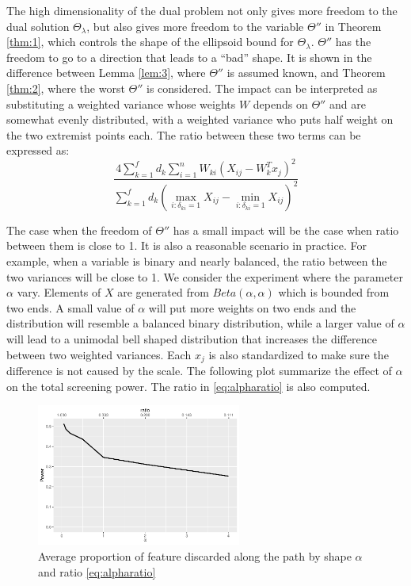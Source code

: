 The high dimensionality of the dual problem not only gives more freedom to the dual solution $\Theta_\lambda$, but also gives more freedom to the variable $\Theta''$ in Theorem \ref{thm:1}, which controls the shape of the ellipsoid bound for $\Theta_\lambda$. $\Theta''$ has the freedom to go to a direction that leads to a ``bad'' shape. It is shown in the difference between Lemma \ref{lem:3}, where $\Theta''$ is assumed known, and Theorem \ref{thm:2}, where the worst $\Theta''$ is considered. The impact can be interpreted as substituting a weighted variance whose weights $W$ depends on $\Theta''$ and are somewhat evenly distributed, with a weighted variance who puts half weight on the two extremist points each. The ratio between these two terms can be expressed as:
\begin{equation}
    \label{eq:alpharatio}
    \frac{4\sum_{k=1}^fd_k\sum_{i=1}^nW_{ki}\left(X_{ij}-W_k^Tx_j\right)^2}{\sum_{k=1}^fd_k\left(\max_{i:\delta_{ki}=1}X_{ij}-\min_{i:\delta_{ki}=1}X_{ij}\right)^2}
\end{equation}

The case when the freedom of $\Theta''$ has a small impact will be the case when ratio between them is close to 1. It is also a reasonable scenario in practice. For example, when a variable is binary and nearly balanced, the ratio between the two variances will be close to 1. We consider the experiment where the parameter $\alpha$ vary. Elements of $X$ are generated from $Beta(\alpha,\alpha)$ which is bounded from two ends. A small value of $\alpha$ will put more weights on two ends and the distribution will resemble a balanced binary distribution, while a larger value of $\alpha$ will lead to a unimodal bell shaped distribution that increases the difference between two weighted variances. Each $x_j$ is also standardized to make sure the difference is not caused by the scale. The following plot summarize the effect of $\alpha$ on the total screening power. The ratio in \eqref{eq:alpharatio} is also computed.

\begin{figure}[ht]
    \centering
    \includegraphics[width=0.6\textwidth]{alpha.pdf}  
    \caption{Average proportion of feature discarded along the path by shape $\alpha$ and ratio \eqref{eq:alpharatio}}
\end{figure}


